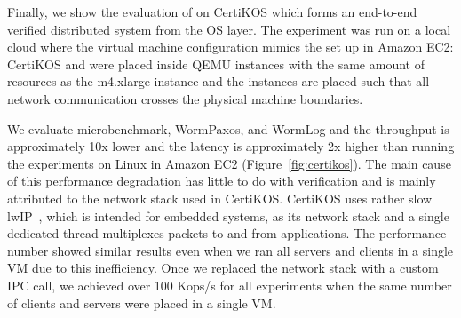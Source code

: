 Finally, we show the evaluation of \sysname{} on CertiKOS which forms an end-to-end verified distributed system from the OS layer. The experiment was run on a local cloud where the virtual machine configuration mimics the set up in Amazon EC2: CertiKOS and \sysname{} were placed inside QEMU instances with the same amount of resources as the m4.xlarge instance and the instances are placed such that all network communication crosses the physical machine boundaries. 

We evaluate microbenchmark, WormPaxos, and WormLog and the throughput is approximately 10x lower and the latency is approximately 2x higher than running the experiments on Linux in Amazon EC2 (Figure~\ref{fig:certikos}). The main cause of this performance degradation has little to do with verification and is mainly attributed to the network stack used in CertiKOS. CertiKOS uses rather slow lwIP~\cite{lwip}, which is intended for embedded systems, as its network stack and a single dedicated thread multiplexes packets to and from applications. The performance number showed similar results even when we ran all \sysname{} servers and clients in a single VM due to this inefficiency. Once we replaced the network stack with a custom IPC call, we achieved over 100 Kops/s for all experiments when the same number of \sysname{} clients and servers were placed in a single VM. 

